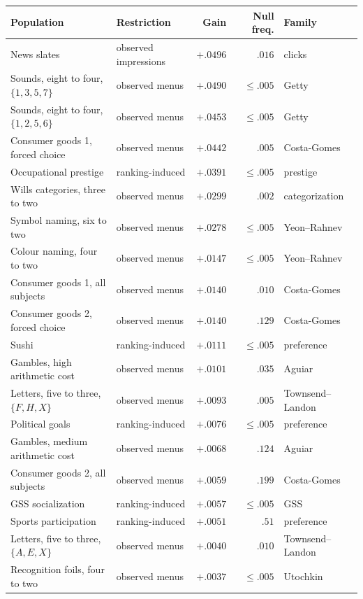 \documentclass[11pt]{article}
\begin{document}
\begin{table}[!t]
\centering
\small
\begin{tabular}{llrrl}
\toprule
Population & Restriction & Gain & Null freq. & Family \\
\midrule
News slates & observed impressions & $+.0496$ & $.016$\footnotemark[7] & clicks \\
Sounds, eight to four, $\{1,3,5,7\}$ & observed menus & $+.0490$ & $\le .005$ & Getty \\
Sounds, eight to four, $\{1,2,5,6\}$ & observed menus & $+.0453$ & $\le .005$ & Getty \\
Consumer goods 1, forced choice & observed menus & $+.0442$ & $.005$ & Costa-Gomes \\
Occupational prestige & ranking-induced & $+.0391$ & $\le .005$ & prestige \\
Wills categories, three to two & observed menus & $+.0299$ & $.002$ & categorization \\
Symbol naming, six to two & observed menus & $+.0278$ & $\le .005$ & Yeon--Rahnev \\
Colour naming, four to two & observed menus & $+.0147$ & $\le .005$ & Yeon--Rahnev \\
Consumer goods 1, all subjects & observed menus & $+.0140$ & $.010$ & Costa-Gomes \\
Consumer goods 2, forced choice & observed menus & $+.0140$ & $.129$ & Costa-Gomes \\
Sushi & ranking-induced & $+.0111$ & $\le .005$ & preference \\
Gambles, high arithmetic cost & observed menus & $+.0101$ & $.035$ & Aguiar \\
Letters, five to three, $\{F,H,X\}$ & observed menus & $+.0093$ & $.005$ & Townsend--Landon \\
Political goals & ranking-induced & $+.0076$ & $\le .005$ & preference \\
Gambles, medium arithmetic cost & observed menus & $+.0068$ & $.124$ & Aguiar \\
Consumer goods 2, all subjects & observed menus & $+.0059$ & $.199$ & Costa-Gomes \\
GSS socialization & ranking-induced & $+.0057$ & $\le .005$ & GSS \\
Sports participation & ranking-induced & $+.0051$ & $.51$ & preference \\
Letters, five to three, $\{A,E,X\}$ & observed menus & $+.0040$ & $.010$ & Townsend--Landon \\
Recognition foils, four to two & observed menus & $+.0037$ & $\le .005$ & Utochkin \\

\end{tabular}
\end{table}
\end{document}
